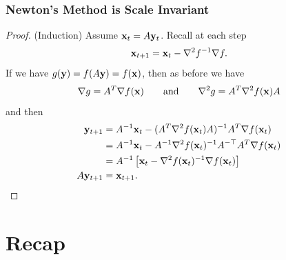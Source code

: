 \documentclass{beamer}
\begin{document}
\begin{frame}
    \frametitle{Newton's Method is Scale Invariant}
    \begin{proof}
        (Induction) Assume ${\bf x}_t = A{\bf y}_t$.
        Recall at each step
        \[
            {\bf x}_{t+1} = {\bf x}_t - \nabla^2 f^{-1} \nabla f.
        \]
        If we have $g({\bf y}) = f(A{\bf y}) = f({\bf x})$, then as before we have
        \[
            \nabla g = A^T\nabla f(\xx) \qquad\text{and}\qquad \nabla^2 g = A^T \nabla^2 f(\xx) A

        \]
        and then
        \begin{align*}
            {\bf y}_{t+1} &= A^{-1}{\bf x}_t - (A^T \nabla^2 f({\bf x}_t) A)^{-1} A^T\nabla f({\bf x}_t)\\
            &= A^{-1}{\bf x}_t - A^{-1} \nabla^2 f({\bf x}_t)^{-1} A^{-\top} A^T\nabla f({\bf x}_t)\\
            &= A^{-1}\left[{\bf x}_t - \nabla^2 f({\bf x}_t)^{-1}\nabla f({\bf x}_t)\right]\\
            A{\bf y}_{t+1} &= {\bf x}_{t+1}.
        \end{align*}
    \end{proof}
\end{frame}

\section{Recap}
\end{document}
